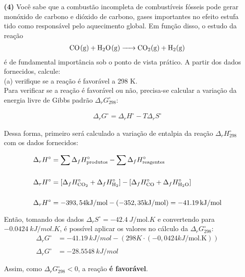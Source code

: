 \textbf{(4)} Você sabe que a combustão incompleta de combustíveis fósseis
pode gerar monóxido de carbono e dióxido de carbono, gases importantes no efeito
estufa tido como responsável pelo aquecimento global. Em função disso, o estudo
da reação
\begin{align*}
    \ce{CO(g) + H2O(g) -> CO2(g) + H2(g)}
\end{align*}
é de fundamental importância sob o ponto de vista prático. A partir dos dados fornecidos,
calcule:\\

(a) verifique se a reação é favorável a 298 K.\\

Para verificar se a reação é favorável ou não, precisa-se calcular a variação da energia livre de Gibbs padrão \( \Delta_rG^\circ_{298}\):

\begin{align*}
	\Delta_rG^\circ = \Delta_rH^\circ - T \Delta_rS^\circ
\end{align*}

Dessa forma, primeiro será calculado a variação de entalpia da reação \( \Delta_rH^\circ_{298}\) com os dados fornecidos:

\begin{align*}
    \Delta_rH^\circ &= \sum\Delta_fH^\circ_{\text{produtos}} -
    \sum\Delta_fH^\circ_{\text{reagentes}}\\ \\
    \Delta_rH^\circ &= [\Delta_fH^\circ_{\ce{CO2}} + \Delta_fH^\circ_{\ce{H2}}]
    - [ \Delta_fH^\circ_{\ce{CO}} + \Delta_fH^\circ_{\ce{H2O}}]\\ \\
    \Delta_rH^\circ &= -393,54\unit{kJ \per \mole} - (-352,35\unit{kJ \per
    \mole}) = \qty{-41,19}{kJ \per \mole}
\end{align*}

Então, tomando dos dados \(\Delta_r S^\circ = \qty{-42,4}{J \per \mole . K}\) e
convertendo para \(\qty{-0,0424}{kJ \per mol . K}\), é possível aplicar os valores no cálculo da \(\Delta_r G^\circ_{298}\):
\begin{align*}
	\Delta_r G^\circ &= \qty{-41,19}{kJ\per mol} - (298K \cdot (-0,0424\unit{kJ
    \per \mole . \kelvin})) \\ \\
	\Delta_r G^\circ &= \qty{-28,5548}{kJ\per mol}
\end{align*}

Assim, como \(\Delta_r G^\circ_{298} < 0\), a reação \textbf{é favorável}. \\ 
 
